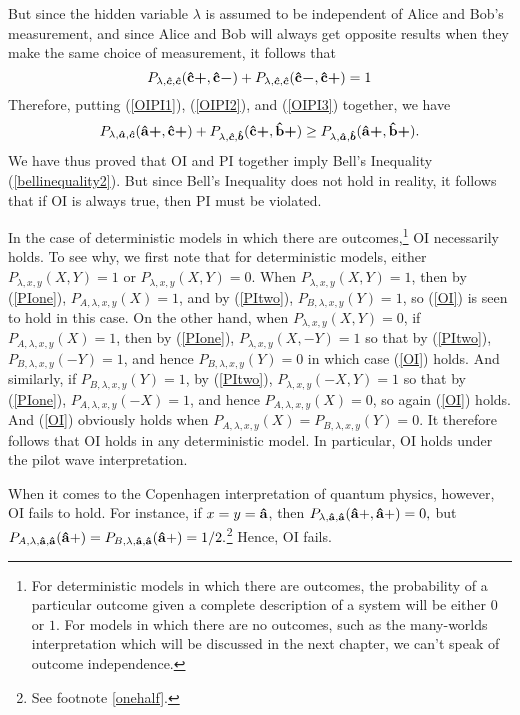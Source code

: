 But since the hidden variable $\lambda$ is assumed to be independent of Alice and Bob's measurement, and since Alice and Bob will always get opposite results when they make the same choice of measurement, it follows that 
\begin{equation}\label{OIPI3}
P_{\lambda,\bm{\hat{c}},\bm{\hat{c}}}(\vb{\hat{{c}}}\bm{+},\vb{\hat{{c}}}\bm{-})+P_{\lambda,\bm{\hat{c}},\bm{\hat{c}}}(\vb{\hat{{c}}}\bm{-},\vb{\hat{{c}}}\bm{+})=1
\end{equation}
Therefore, putting (\ref{OIPI1}), (\ref{OIPI2}), and (\ref{OIPI3}) together, we have
\begin{equation}
P_{\lambda,\bm{\hat{a}},\bm{\hat{c}}}(\vb{\hat{{a}}}\bm{+},\vb{\hat{{c}}}\bm{+})+P_{\lambda,\bm{\hat{c}},\bm{\hat{b}}}(\vb{\hat{{c}}}\bm{+},\vb{\hat{{b}}}\bm{+})\geq P_{\lambda,\bm{\hat{a}},\bm{\hat{b}}}(\vb{\hat{{a}}}\bm{+},\vb{\hat{{b}}}\bm{+}).
\end{equation}
We have thus proved that OI and PI together imply Bell's Inequality (\ref{bellinequality2}). But since Bell's Inequality does not hold in reality, it follows that if OI is always true, then PI must be violated.\label{OIPIproofend}


\label{OIdet}In the case of deterministic models in which there are outcomes,\footnote{For deterministic models in which there are outcomes, the probability of a particular outcome given a complete description of a system will be either $0$ or $1$. For models in which there are no outcomes, such as the many-worlds interpretation which will be discussed in the next chapter, we can't speak of outcome independence.} OI necessarily holds. To see why, we first note that for deterministic models, either $P_{\lambda,x,y}(X,Y)=1$ or $P_{\lambda,x,y}(X,Y)=0$. When $P_{\lambda,x,y}(X,Y)=1$, then by (\ref{PIone}), $P_{A, \lambda,x,y}(X)=1$, and by (\ref{PItwo}), $P_{B, \lambda,x,y}(Y)=1$, so (\ref{OI}) is seen to hold in this case. On the other hand, when $P_{\lambda,x,y}(X,Y)=0$,  if $P_{A, \lambda,x,y}(X)=1$, then by (\ref{PIone}), $P_{\lambda,x,y} (X,-Y)=1$ so that by (\ref{PItwo}), $P_{B, \lambda,x,y}(-Y)=1$, and hence $P_{B, \lambda,x,y}(Y)=0$ in which case (\ref{OI}) holds. And similarly, if $P_{B, \lambda,x,y}(Y)=1$, by (\ref{PItwo}), $P_{\lambda,x,y} (-X,Y)=1$ so that by (\ref{PIone}), $P_{A, \lambda,x,y}(-X)=1$, and hence $P_{A, \lambda,x,y}(X)=0$, so again (\ref{OI}) holds. And (\ref{OI}) obviously holds when $P_{A, \lambda,x,y}(X)=P_{B, \lambda,x,y}(Y)=0$. It therefore follows that OI holds in any deterministic model. In particular, OI holds under the pilot wave interpretation. 

When it comes to the Copenhagen interpretation of quantum physics, however, OI fails to hold. For instance, if $x=y=\vb{\hat{a}}$, then $P_{\lambda,\vb{\hat{a}},\vb{\hat{a}}}(\vb{\hat{a}+},\vb{\hat{a}+})=0,$ but $P_{A, \lambda,\vb{\hat{a}},\vb{\hat{a}}}(\vb{\hat{a}+})=P_{B, \lambda,\vb{\hat{a}},\vb{\hat{a}}}(\vb{\hat{a}+})=1/2.$\footnote{See footnote \ref{onehalf}. } Hence, OI fails. 

